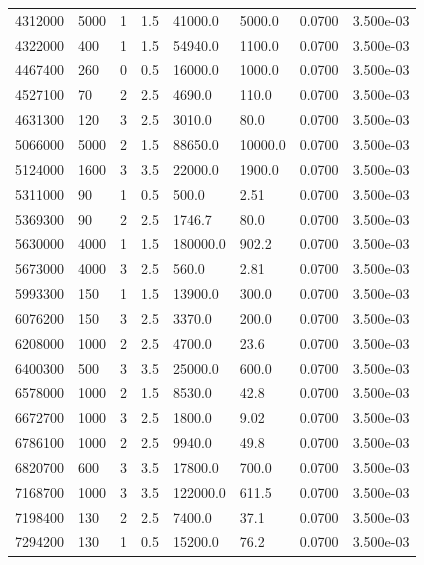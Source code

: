 \documentclass[preview]{standalone}
\begin{document}
{{\begin{tabular}{L{1.2cm}C{1.2cm} C{0.3cm}C{0.5cm} C{1.4cm}C{1.4cm} C{1.4cm}C{1.4cm}}
  4312000  &  5000  & 1     & 1.5 &  41000.0  & 5000.0  & 0.0700 &  3.500e-03   \\ 
  4322000  &   400  & 1     & 1.5 &  54940.0  & 1100.0  & 0.0700 &  3.500e-03   \\ 
  4467400  &   260  & 0     & 0.5 &  16000.0  & 1000.0  & 0.0700 &  3.500e-03   \\ 
  4527100  &    70  & 2     & 2.5 &  4690.0  & 110.0  & 0.0700 &  3.500e-03   \\ 
  4631300  &   120  & 3     & 2.5 &  3010.0  & 80.0  & 0.0700 &  3.500e-03   \\ 
  5066000  &  5000  & 2     & 1.5 &  88650.0  & 10000.0  & 0.0700 &  3.500e-03   \\ 
  5124000  &  1600  & 3     & 3.5 &  22000.0  & 1900.0  & 0.0700 &  3.500e-03   \\ 
  5311000  &    90  & 1     & 0.5 &  500.0  & 2.51  & 0.0700 &  3.500e-03   \\ 
  5369300  &    90  & 2     & 2.5 &  1746.7  & 80.0  & 0.0700 &  3.500e-03   \\ 
  5630000  &  4000  & 1     & 1.5 &  180000.0  & 902.2  & 0.0700 &  3.500e-03   \\ 
  5673000  &  4000  & 3     & 2.5 &  560.0  & 2.81  & 0.0700 &  3.500e-03   \\ 
  5993300  &   150  & 1     & 1.5 &  13900.0  & 300.0  & 0.0700 &  3.500e-03   \\ 
  6076200  &   150  & 3     & 2.5 &  3370.0  & 200.0  & 0.0700 &  3.500e-03   \\ 
  6208000  &  1000  & 2     & 2.5 &  4700.0  & 23.6  & 0.0700 &  3.500e-03   \\ 
  6400300  &   500  & 3     & 3.5 &  25000.0  & 600.0  & 0.0700 &  3.500e-03   \\ 
  6578000  &  1000  & 2     & 1.5 &  8530.0  & 42.8  & 0.0700 &  3.500e-03   \\ 
  6672700  &  1000  & 3     & 2.5 &  1800.0  & 9.02  & 0.0700 &  3.500e-03   \\ 
  6786100  &  1000  & 2     & 2.5 &  9940.0  & 49.8  & 0.0700 &  3.500e-03   \\ 
  6820700  &   600  & 3     & 3.5 &  17800.0  & 700.0  & 0.0700 &  3.500e-03   \\ 
  7168700  &  1000  & 3     & 3.5 &  122000.0  & 611.5  & 0.0700 &  3.500e-03   \\ 
  7198400  &   130  & 2     & 2.5 &  7400.0  & 37.1  & 0.0700 &  3.500e-03   \\ 
  7294200  &   130  & 1     & 0.5 &  15200.0  & 76.2  & 0.0700 &  3.500e-03   \\ 

\end{tabular}}}
\end{document}
